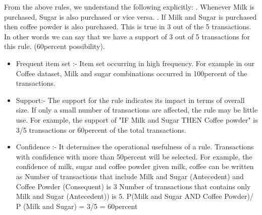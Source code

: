 \documentclass[10pt,a4paper]{article}
\begin{document}
{{From the above rules, we understand the following explicitly:
.	Whenever Milk is purchased, Sugar is also purchased or vice versa. 
.	If Milk and Sugar is purchased then coffee powder is also purchased. This is true in 3 out of the 5 transactions. In other words we can say that we have a support of 3 out of 5 transactions for this rule. (60percent possibility). 

\begin{itemize}
\item Frequent item set :- Item set occurring in high frequency. For example in our Coffee dataset, Milk and sugar combinations occurred in 100percent of the transactions.
\item Support:-  The support for the rule indicates its impact in terms of overall size.  If only a small number of transactions are affected, the rule may be little use. For example, the support of "IF Milk and Sugar THEN Coffee powder" is 3/5 transactions or 60percent of the total transactions.
\item Confidence :- It determines the operational usefulness of a rule. Transactions with confidence with more than 50percent will be selected.  For example, the confidence of milk, sugar and coffee powder given milk, coffee can be written as
Number of transactions that include Milk and Sugar (Antecedent) and Coffee Powder (Consequent) is 3
Number of transactions that contains only Milk and Sugar (Antecedent)) is 5.
\newline
P(Milk and Sugar AND Coffee Powder)/ P (Milk and Sugar)  =  3/5 = 60percent

\end{itemize}

}}
\end{document}
